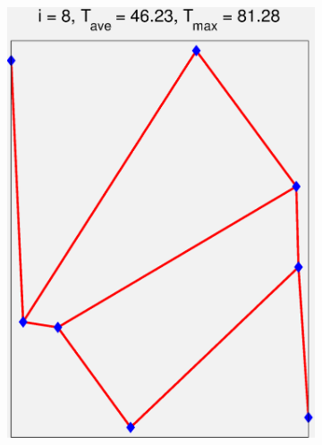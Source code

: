 \documentclass[11pt,letterpaper]{article}
\begin{document}
\begin{figure}[!h]
\begin{subfigure}{0.2\textwidth}
\includegraphics[width=\linewidth]{parallelTwo_Pmax30k_channel_8.eps}
\caption{}
\end{subfigure}
\begin{subfigure}{0.2\textwidth}

\end{subfigure}
\end{figure}
\end{document}
